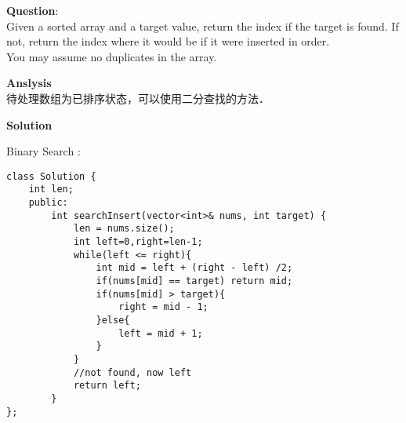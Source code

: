 \begin{description}
    \item{\textbf{Question}}:\\%
		Given a sorted array and a target value, return the index if the target is found. If not, return the index where it would be if it were inserted in order.\\
		You may assume no duplicates in the array.\\

    \item{\textbf{Anslysis}}\\
		待处理数组为已排序状态，可以使用二分查找的方法．\\

    \item{\textbf{Solution}}\\
	\item{Binary Search} : \\
		\begin{lstlisting}
class Solution {
	int len;
	public:
		int searchInsert(vector<int>& nums, int target) {
			len = nums.size();
			int left=0,right=len-1;
			while(left <= right){
				int mid = left + (right - left) /2;
				if(nums[mid] == target)	return mid;
				if(nums[mid] > target){
					right = mid - 1;
				}else{
					left = mid + 1;
				}
			}
			//not found, now left 
			return left;
		}
};
		\end{lstlisting}
\end{description}

